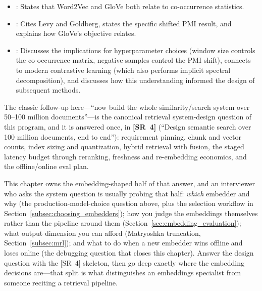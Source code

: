 \begin{interviewq}
\goodgreat
\begin{itemize}
    \item {}: States that Word2Vec and GloVe both relate to
    co-occurrence statistics.
    \item {}: Cites Levy and Goldberg, states the specific
    shifted PMI result, and explains how GloVe's objective relates.
    \item {}: Discusses the implications for hyperparameter
    choices (window size controls the co-occurrence matrix, negative
    samples control the PMI shift), connects to modern contrastive learning
    (which also performs implicit spectral decomposition), and discusses
    how this understanding informed the design of subsequent methods.
\end{itemize}

\end{interviewq}

\vspace{0.5em}

\begin{keyinsight}
The classic follow-up here---``now build the whole similarity/search system over 50--100
million documents''---is the canonical retrieval system-design question of this program,
and it is answered once, in \textbf{[SR~4]} (``Design semantic search over 100 million
documents, end to end''): requirement pinning, chunk and vector counts, index sizing and
quantization, hybrid retrieval with fusion, the staged latency budget through reranking,
freshness and re-embedding economics, and the offline/online eval plan.

This chapter owns the embedding-shaped half of that answer, and an interviewer who asks
the system question is usually probing that half: \emph{which} embedder and why (the
production-model-choice question above, plus the selection workflow in
Section~\ref{subsec:choosing_embedders}); how you judge the embeddings themselves rather
than the pipeline around them (Section~\ref{sec:embedding_evaluation}); what output
dimension you can afford (Matryoshka truncation, Section~\ref{subsec:mrl}); and what to do
when a new embedder wins offline and loses online (the debugging question that closes this
chapter). Answer the design question with the [SR~4] skeleton, then go deep exactly where
the embedding decisions are---that split is what distinguishes an embeddings specialist
from someone reciting a retrieval pipeline.
\end{keyinsight}


